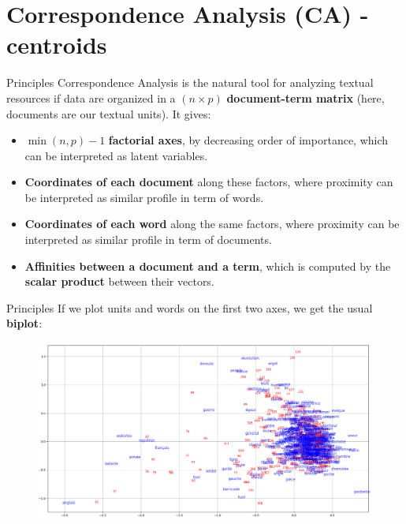 \documentclass[10pt]{beamer}
\newcommand{\imp}[1]{\textbf{\color{cyan}#1}}
\begin{document}
	
	\section[Correspondence Analysis (CA) - centroids]{Correspondence Analysis (CA) - centroids}
	
	
	\begin{frame}{Principles}
		Correspondence Analysis is the natural tool for analyzing textual resources if data are organized in a $(n \times p)$ \imp{document-term matrix} \cite{lebart_analyse_2019} (here, documents are our textual units). It gives:
		\begin{itemize}
			\item $\min(n, p) - 1$ \imp{factorial axes}, by decreasing order of importance, which can be interpreted as latent variables.
			\item \imp{Coordinates of each document} along these factors, where proximity can be interpreted as similar profile in term of words.
			\item \imp{Coordinates of each word} along the same factors, where proximity can be interpreted as similar profile in term of documents.
			\item \imp{Affinities between a document and a term}, which is computed by the \imp{scalar product} between their vectors.
		\end{itemize}
	\end{frame}
	
	
	\begin{frame}{Principles}
		If we plot units and words on the first two axes, we get the usual \imp{biplot}:
		\begin{figure}
			\centering
			\includegraphics[width=\textwidth]{img/biplot.png}
		\end{figure}
	\end{frame}
	
\end{document}
